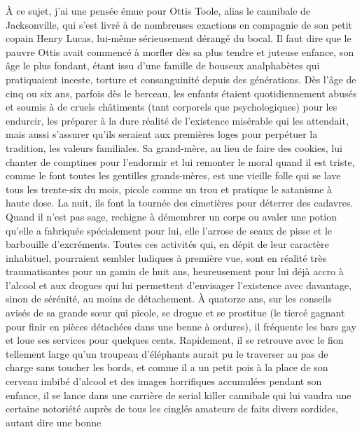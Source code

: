 %
À ce sujet, j’ai une pensée émue pour Ottis Toole, alias le cannibale de Jacksonville, qui s’est livré à de nombreuses exactions en compagnie de son petit copain Henry Lucas, lui-même sérieusement dérangé du bocal. Il faut dire que le pauvre Ottis avait commencé à morfler dès sa plus tendre et juteuse enfance, son âge le plus fondant, étant issu d’une famille de bouseux analphabètes qui pratiquaient inceste, torture et consanguinité depuis des générations. Dès l’âge de cinq ou six ans, parfois dès le berceau, les enfants étaient quotidiennement abusés et soumis à de cruels châtiments (tant corporels que psychologiques) pour les endurcir, les préparer à la dure réalité de l’existence misérable qui les attendait, mais aussi s’assurer qu’ils seraient aux premières loges pour perpétuer la tradition, les valeurs familiales. Sa grand-mère, au lieu de faire des cookies, lui chanter de comptines pour l’endormir et lui remonter le moral quand il est triste, comme le font toutes les gentilles grands-mères, est une vieille folle qui se lave tous les trente-six du mois, picole comme un trou et pratique le satanisme à haute dose. La nuit, ils font la tournée des cimetières pour déterrer des cadavres. Quand il n’est pas sage, rechigne à démembrer un corps ou avaler une potion qu’elle a fabriquée spécialement pour lui, elle l’arrose de seaux de pisse et le barbouille d’excréments. Toutes ces activités qui, en dépit de leur caractère inhabituel, pourraient sembler ludiques à première vue, sont en réalité très traumatisantes pour un gamin de huit ans, heureusement pour lui déjà accro à l’alcool et aux drogues qui lui permettent d’envisager l’existence avec davantage, sinon de sérénité, au moins de détachement. À quatorze ans, sur les conseils avisés de sa grande sœur qui picole, se drogue et se prostitue (le tiercé gagnant pour finir en pièces détachées dans une benne à ordures), il fréquente les bars gay et loue ses services pour quelques cents. Rapidement, il se retrouve avec le fion tellement large qu’un troupeau d’éléphants aurait pu le traverser au pas de charge sans toucher les bords, et comme il a un petit pois à la place de son cerveau imbibé d’alcool et des images horrifiques accumulées pendant son enfance, il se lance dans une carrière de serial killer cannibale qui lui vaudra une certaine notoriété auprès de tous les cinglés amateurs de faits divers sordides, autant dire une bonne 